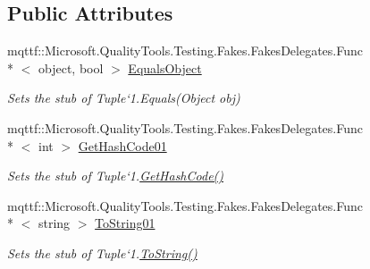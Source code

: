 \subsection*{Public Attributes}
\begin{DoxyCompactItemize}
\item 
mqttf\-::\-Microsoft.\-Quality\-Tools.\-Testing.\-Fakes.\-Fakes\-Delegates.\-Func\\*
$<$ object, bool $>$ \hyperlink{class_system_1_1_fakes_1_1_stub_tuple_3_01_t1_01_4_a46f7508861f5088bcc87867571dcd9a9}{Equals\-Object}
\begin{DoxyCompactList}\small\item\em Sets the stub of Tuple`1.Equals(\-Object obj)\end{DoxyCompactList}\item 
mqttf\-::\-Microsoft.\-Quality\-Tools.\-Testing.\-Fakes.\-Fakes\-Delegates.\-Func\\*
$<$ int $>$ \hyperlink{class_system_1_1_fakes_1_1_stub_tuple_3_01_t1_01_4_a6f43596556d8d254866ea5c0536cde2f}{Get\-Hash\-Code01}
\begin{DoxyCompactList}\small\item\em Sets the stub of Tuple`1.\hyperlink{class_system_1_1_fakes_1_1_stub_tuple_3_01_t1_01_4_a2bb2ead87f42f54af7117f6c6b104f9d}{Get\-Hash\-Code()}\end{DoxyCompactList}\item 
mqttf\-::\-Microsoft.\-Quality\-Tools.\-Testing.\-Fakes.\-Fakes\-Delegates.\-Func\\*
$<$ string $>$ \hyperlink{class_system_1_1_fakes_1_1_stub_tuple_3_01_t1_01_4_a260346aa0eefef745091e54fc155d16d}{To\-String01}
\begin{DoxyCompactList}\small\item\em Sets the stub of Tuple`1.\hyperlink{class_system_1_1_fakes_1_1_stub_tuple_3_01_t1_01_4_a00eaa596b6eb16badf37e7d10974b60a}{To\-String()}\end{DoxyCompactList}\end{DoxyCompactItemize}
